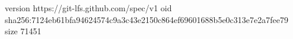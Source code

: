 version https://git-lfs.github.com/spec/v1
oid sha256:7124eb61bfa94624574c9a3c43e2150c864ef69601688b5e0c313e7e2a7fee79
size 71451
